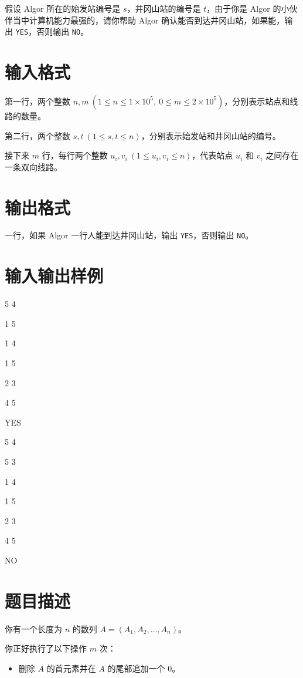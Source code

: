 \documentclass{../cpct/ctpro}
\begin{document}
假设 Algor 所在的始发站编号是 $s$，井冈山站的编号是 $t$，由于你是 Algor 的小伙伴当中计算机能力最强的，请你帮助 Algor 确认能否到达井冈山站，如果能，输出 \texttt{YES}，否则输出 \texttt{NO}。

\section*{输入格式}

第一行，两个整数 $n,m~(1 \leq n \leq 1 \times {10}^{5},~0 \leq m \leq 2 \times {10}^{5})$，分别表示站点和线路的数量。

第二行，两个整数 $s,t~(1 \leq s,t \leq n)$，分别表示始发站和井冈山站的编号。

接下来 $m$ 行，每行两个整数 $u_i, v_i~(1 \leq u_i,v_i \leq n)$，代表站点 $u_i$ 和 $v_i$ 之间存在一条双向线路。

\section*{输出格式}

一行，如果 Algor 一行人能到达井冈山站，输出 \texttt{YES}，否则输出 \texttt{NO}。

\section*{输入输出样例}
\testcasetab
{
    5 4\par
    1 5\par
    1 4\par
    1 5\par
    2 3\par
    4 5
}
{
    YES
}
\testcasetab
{
    5 4\par
    5 3\par
    1 4\par
    1 5\par
    2 3\par
    4 5
}
{
    NO
}

\makeproblem
\section*{题目描述}

你有一个长度为 $n$ 的数列 $A=(A_1,A_2,\dots,A_n)$。

你正好执行了以下操作 $m$ 次：

\begin{itemize}
    \item 删除 $A$ 的首元素并在 $A$ 的尾部追加一个 $0$。
\end{itemize}
\end{document}
